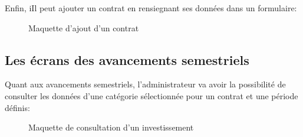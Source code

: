 \documentclass[a4paper]{report}
\begin{document}
\begin{doublespace}
	Enfin, iIl peut ajouter un contrat en rensiegnant ses données dans un formulaire:
	\begin{figure}[H]
		\begin{center}
			\caption{Maquette d'ajout d'un contrat}
		\end{center}
	\end{figure}

	\subsection{Les écrans des avancements semestriels}

	Quant aux avancements semestriels, l'administrateur va avoir la possibilité
	de consulter les données d'une catégorie sélectionnée pour un contrat et une période définis:
	\begin{figure}[H]
		\begin{center}
			\caption{Maquette de consultation d'un investissement}
		\end{center}
	\end{figure}


\end{doublespace}
\end{document}
